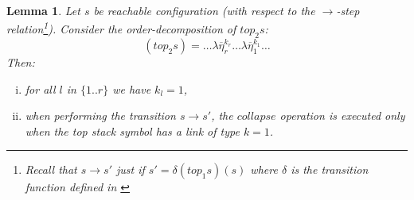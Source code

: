 \documentclass{article}
\newtheorem{lemma}{Lemma}[section]
\theoremstyle{remark}
\theoremstyle{definition}
\begin{document}
\begin{lemma}
Let $s$ be reachable configuration (with respect to the $\rightarrow$-step relation\footnote{Recall that $s\rightarrow s'$ just if $s' = \delta(top_1 s)(s)$ where $\delta$ is the transition function defined in \cite[Figure 2]{hague-sto07}}). Consider the order-decomposition of $top_2 s$:
$$ (top_2 s) = \ldots \lambda \overline{\eta}_r^{k_r}   
\ldots  \lambda \overline{\eta}_1^{k_1}  \ldots $$
Then:
\begin{enumerate}[i.]
\item for all $l$ in $\{ 1..r \}$ we have $k_l = 1$,
\item when performing the transition $s \rightarrow s'$, the $collapse$ operation is executed only when the top stack symbol has a link of type $k=1$.
\end{enumerate}
\end{lemma}
\end{document}
